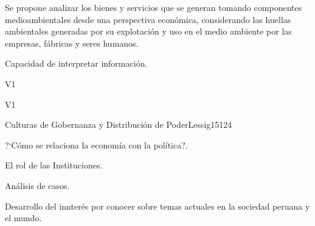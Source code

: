 \begin{syllabus}


\begin{justification}
Se propone analizar los bienes y servicios que se generan tomando componentes medioambientales desde una perspectiva económica, considerando las huellas ambientales generadas por su explotación y uso en el medio ambiente por las empresas, fábricas y seres humanos. 
\end{justification}

\begin{goals}
\item Capacidad de interpretar información.
\end{goals}

\begin{outcomes}{V1}
    \item {}
    \item {}
    \item {}
    
\end{outcomes}

\begin{competences}{V1}
    \item {}
    \item {}
    \item {}
    \item {}
\end{competences}

\begin{unit}{Culturas de Gobernanza y Distribución de Poder}{}{Lessig15}{12}{4}
   \begin{topics}
      \item ?`Cómo se relaciona la economía con la política?.
      \item El rol de las Instituciones.
      \item Análisis de casos.
   \end{topics}
   \begin{learningoutcomes}
      \item Desarrollo del innterés por conocer sobre temas actuales en la sociedad peruana y el mundo.
   \end{learningoutcomes}
\end{unit}

\begin{coursebibliography}
\end{coursebibliography}

\end{syllabus}
